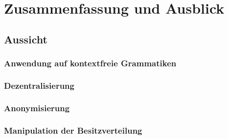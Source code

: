 \documentclass[a4paper,12pt]{article}
\begin{document}
\listoftodos[Aufgaben]




\section{Zusammenfassung und Ausblick}

\subsection*{Aussicht}

\subsubsection*{Anwendung auf kontextfreie Grammatiken}



\subsubsection*{Dezentralisierung}

\subsubsection*{Anonymisierung}

\subsubsection*{Manipulation der Besitzverteilung}
\end{document}
